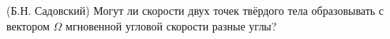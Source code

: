 (Б.Н. Садовский)
Могут ли скорости двух точек твёрдого тела образовывать с вектором
$\Omega$ мгновенной угловой скорости разные углы?
